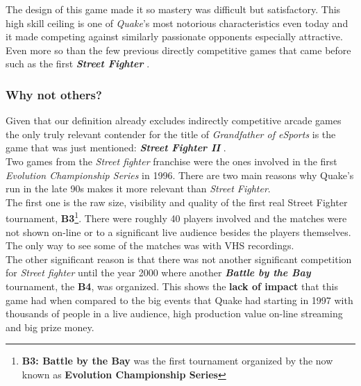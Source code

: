 The design of this game made it so mastery was difficult but satisfactory. This high skill ceiling is one of \textit{Quake}'s most notorious characteristics even today and it made competing against similarly passionate opponents especially attractive. Even more so than the few previous directly competitive games that came before such as the first \textit{\textbf{Street Fighter}} \citep{game:streetfighter2}.\\

\subsubsection{Why not others?}

Given that our definition already excludes indirectly competitive arcade games the only truly relevant contender for the title of \textit{Grandfather of eSports} is the game that was just mentioned: \textbf{\textit{Street Fighter II}} \citep{game:streetfighter2}.\\

Two games from the \textit{Street fighter} franchise were the ones involved in the first \textit{Evolution Championship Series} in 1996. There are two main reasons why Quake's run in the late 90s makes it more relevant than \textit{Street Fighter}.\\

The first one is the raw size, visibility and quality of the first real Street Fighter tournament, \textbf{B3}\footnote{\textbf{B3: Battle by the Bay}\citep{evo} was the first tournament organized by the now known as \textbf{Evolution Championship Series}}. There were roughly 40 players involved and the matches were not shown on-line or to a significant live audience besides the players themselves. The only way to see some of the matches was with VHS recordings.\\

The other significant reason is that there was not another significant competition for \textit{Street fighter} until the year 2000 where another \textit{\textbf{Battle by the Bay}} tournament, the \textbf{B4}, was organized. This shows the \textbf{lack of impact} that this game had when compared to the big events that Quake had starting in 1997 with thousands of people in a live audience, high production value on-line streaming and big prize money.
